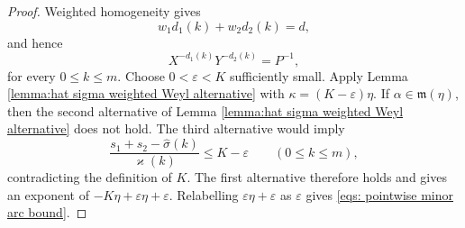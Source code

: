 \documentclass[12pt,reqno]{amsart}
\theoremstyle{definition}
\theoremstyle{remark}
\numberwithin{equation}{section}
\def\grm{{\mathfrak m}}\def\grM{{\mathfrak M}}
\def\a{{\alpha}} \def\bfalp{{\boldsymbol \alpha}} \def\atil{{\widetilde \alpha}}
\def\eps{\varepsilon}
\begin{document}
\begin{proof}
    Weighted homogeneity gives
    \[
        w_1d_1(k)+w_2d_2(k)=d,
    \]
    and hence
    \[
        X^{-d_1(k)}Y^{-d_2(k)}=P^{-1},
    \]
    for every $0\leq k\leq m$. Choose
    $0<\eps<K$ sufficiently small.
    Apply Lemma \ref{lemma:hat sigma weighted Weyl alternative} with
    $\kappa=(K-\eps)\eta$. If $\a\in\grm(\eta)$, then the second
    alternative of Lemma
    \ref{lemma:hat sigma weighted Weyl alternative} does not hold. The third
    alternative would imply
    \[
        \frac{s_1+s_2-\widehat{\sigma}(k)}{\varkappa(k)}
        \leq K-\eps
        \qquad
        \left(0\leq k\leq m\right),
    \]
    contradicting the definition of $K$. The first alternative therefore
    holds and gives an exponent of $-K\eta+\eps\eta+\eps$.
    Relabelling $\eps\eta+\eps$ as $\eps$ gives
    \eqref{eqs: pointwise minor arc bound}.
\end{proof}
\end{document}
